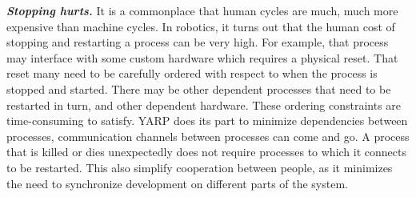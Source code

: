 \textit{\textbf{Stopping hurts.}}
It is a commonplace that human cycles are much, much more expensive
than machine cycles.  In robotics, it turns out that the human
cost of stopping and restarting a process can be very high.
For example, that process may interface with some
custom hardware which requires a physical reset.  
That reset many need to be carefully ordered with respect to when the
process is stopped and started.
%
There may be other dependent processes that need to be restarted in
turn, and other dependent hardware. 
%
%
%
These ordering constraints are time-consuming to satisfy.
%
YARP does its part to minimize dependencies between processes,
communication channels between processes can come and go. 
A process that is killed or dies
unexpectedly does not require processes to which it connects to be
restarted. This also simplify cooperation between people, as
it minimizes the need to synchronize development on different  
parts of the system.
%
%

